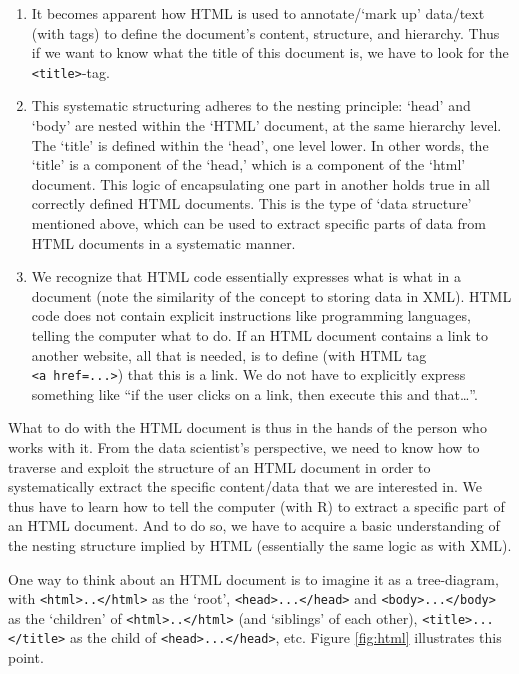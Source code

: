 \documentclass[
  12pt,
]{style/krantz}
\providecommand{\tightlist}{%
  \setlength{\itemsep}{0pt}\setlength{\parskip}{0pt}}
\begin{document}
\begin{enumerate}
\def\labelenumi{\arabic{enumi}.}
\tightlist
\item
  It becomes apparent how HTML is used to annotate/`mark up' data/text (with tags) to define the document's content, structure, and hierarchy. Thus if we want to know what the title of this document is, we have to look for the \texttt{\textless{}title\textgreater{}}-tag.
\item
  This systematic structuring adheres to the nesting principle: `head' and `body' are nested within the `HTML' document, at the same hierarchy level. The `title' is defined within the `head', one level lower. In other words, the `title' is a component of the `head,' which is a component of the `html' document. This logic of encapsulating one part in another holds true in all correctly defined HTML documents. This is the type of `data structure' mentioned above, which can be used to extract specific parts of data from HTML documents in a systematic manner.
\item
  We recognize that HTML code essentially expresses what is what in a document (note the similarity of the concept to storing data in XML). HTML code does not contain explicit instructions like programming languages, telling the computer what to do. If an HTML document contains a link to another website, all that is needed, is to define (with HTML tag \texttt{\textless{}a\ href=...\textgreater{}}) that this is a link. We do not have to explicitly express something like ``if the user clicks on a link, then execute this and that\ldots{}''.
\end{enumerate}

What to do with the HTML document is thus in the hands of the person who works with it. From the data scientist's perspective, we need to know how to traverse and exploit the structure of an HTML document in order to systematically extract the specific content/data that we are interested in. We thus have to learn how to tell the computer (with R) to extract a specific part of an HTML document. And to do so, we have to acquire a basic understanding of the nesting structure implied by HTML (essentially the same logic as with XML).

One way to think about an HTML document is to imagine it as a tree-diagram, with \texttt{\textless{}html\textgreater{}..\textless{}/html\textgreater{}} as the `root', \texttt{\textless{}head\textgreater{}...\textless{}/head\textgreater{}} and \texttt{\textless{}body\textgreater{}...\textless{}/body\textgreater{}} as the `children' of \texttt{\textless{}html\textgreater{}..\textless{}/html\textgreater{}} (and `siblings' of each other), \texttt{\textless{}title\textgreater{}...\textless{}/title\textgreater{}} as the child of \texttt{\textless{}head\textgreater{}...\textless{}/head\textgreater{}}, etc. Figure \ref{fig:html} illustrates this point.
\end{document}
